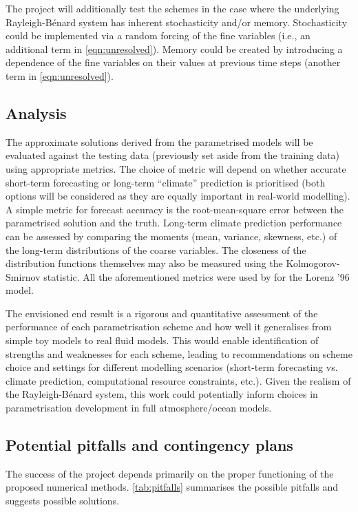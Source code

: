 \documentclass[titlepage]{article}
\newcommand{\rb}{Rayleigh-B\'{e}nard}
\begin{document}
The project will additionally test the schemes in the case where the
underlying \rb{} system has inherent stochasticity and/or memory.
Stochasticity could be implemented via a random forcing of the fine
variables (i.e., an additional term in \autoref{eqn:unresolved}). Memory
could be created by introducing a dependence of the fine variables on their
values at previous time steps (another term in \autoref{eqn:unresolved}).

\subsection{Analysis}
The approximate solutions derived from the parametrised models will be
evaluated against the testing data (previously set aside from the training
data) using appropriate metrics. The choice of metric will depend on whether
accurate short-term forecasting or long-term ``climate'' prediction is
prioritised (both options will be considered as they are equally important in
real-world modelling). A simple metric for forecast accuracy is the
root-mean-square error between the parametrised solution and the truth.
Long-term climate prediction performance can be assessed by comparing the
moments (mean, variance, skewness, etc.) of the long-term distributions of the
coarse variables. The closeness of the distribution functions themselves may
also be measured using the Kolmogorov-Smirnov statistic. All the aforementioned
metrics were used by \textcite{wilks2005} for the Lorenz '96 model.

The envisioned end result is a rigorous and quantitative assessment of the
performance of each parametrisation scheme and how well it generalises from
simple toy models to real fluid models. This would enable identification of
strengths and weaknesses for each scheme, leading to recommendations on
scheme choice and settings for different modelling scenarios (short-term
forecasting vs. climate prediction, computational resource constraints, etc.).
Given the realism of the \rb{} system, this work could potentially inform
choices in parametrisation development in full atmosphere/ocean models.

\subsection{Potential pitfalls and contingency plans}
The success of the project depends primarily on the proper functioning of
the proposed numerical methods. \autoref{tab:pitfalls} summarises the possible
pitfalls and suggests possible solutions.
\end{document}

